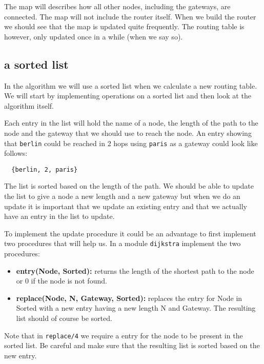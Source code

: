 \documentclass[a4paper, 11pt]{article}
\begin{document}
The map will describes how all other nodes, including the gateways,
are connected. The map will not include the router itself. When we
build the router we should see that the map is updated quite
frequently. The routing table is however, only updated once in a
while (when we say so).

\subsection{a sorted list}

In the algorithm we will use a sorted list when we calculate a new
routing table. We will start by implementing operations on a sorted
list and then look at the algorithm itself.

Each entry in the list will hold the name of a node, the length of the
path to the node and the gateway that we should use to reach the
node. An entry showing that {\tt berlin} could be reached in 2 hops
using {\tt paris} as a gateway could look like follows:

\begin{verbatim}
  {berlin, 2, paris}
\end{verbatim}

The list is sorted based on the length of the path. We should be able
to update the list to give a node a new length and a new gateway but
when we do an update it is important that we update an existing entry
and that we actually have an entry in the list to update.

To implement the update procedure it could be an advantage to first
implement two procedures that will help us. 
In a module {\tt dijkstra} implement the
two procedures:

\begin{itemize}

\item {\bf entry(Node, Sorted):} returns the length of the shortest
path to the node or $0$ if the node is not found.

\item {\bf replace(Node, N, Gateway, Sorted):} replaces the entry for Node
in Sorted with a new entry having a new length N and Gateway. The
resulting list should of course be sorted.
\end{itemize}

Note that in {\tt replace/4} we require a entry for the node to be
present in the sorted list. Be careful and make sure that the
resulting list is sorted based on the new entry.
\end{document}
